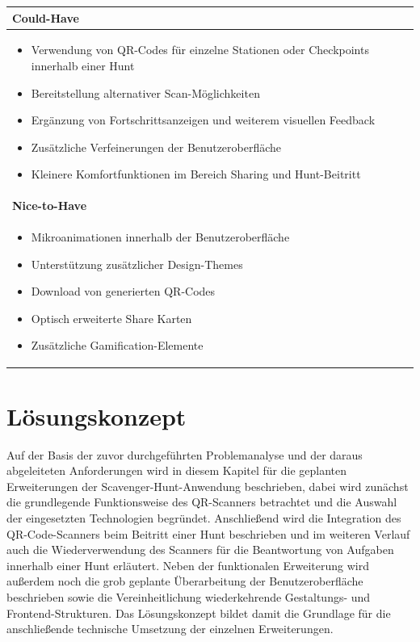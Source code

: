 ﻿\documentclass[oneside]{ausarbeitung}
\begin{document}
\begin{longtable}{|p{\dimexpr\textwidth-2\tabcolsep-2\arrayrulewidth\relax}|}
\textbf{Could-Have} \\ \hline

\begin{itemize}
    \item Verwendung von QR-Codes für einzelne Stationen oder Checkpoints innerhalb einer Hunt
    \item Bereitstellung alternativer Scan-Möglichkeiten
    \item Ergänzung von Fortschrittsanzeigen und weiterem visuellen Feedback
    \item Zusätzliche Verfeinerungen der Benutzeroberfläche
    \item Kleinere Komfortfunktionen im Bereich Sharing und Hunt-Beitritt
\end{itemize}
\\ \hline

\textbf{Nice-to-Have} \\ \hline

\begin{itemize}
    \item Mikroanimationen innerhalb der Benutzeroberfläche
    \item Unterstützung zusätzlicher Design-Themes
    \item Download von generierten QR-Codes
    \item Optisch erweiterte Share Karten
    \item Zusätzliche Gamification-Elemente
\end{itemize}
\\ \hline

\end{longtable}



\chapter{Lösungskonzept}
\label{cha:loesungskonzept}

Auf der Basis der zuvor durchgeführten Problemanalyse und der daraus abgeleiteten Anforderungen wird in diesem Kapitel für die geplanten Erweiterungen der 
Scavenger-Hunt-Anwendung beschrieben, dabei wird zunächst die grundlegende Funktionsweise des QR-Scanners betrachtet und die Auswahl der eingesetzten Technologien 
begründet. Anschließend wird die Integration des QR-Code-Scanners beim Beitritt einer Hunt beschrieben und im weiteren Verlauf auch die Wiederverwendung des Scanners
für die Beantwortung von Aufgaben innerhalb einer Hunt erläutert. Neben der funktionalen Erweiterung wird außerdem noch die grob geplante Überarbeitung der
Benutzeroberfläche beschrieben sowie die Vereinheitlichung wiederkehrende Gestaltungs- und Frontend-Strukturen. Das Lösungskonzept bildet damit die Grundlage für 
die anschließende technische Umsetzung der einzelnen Erweiterungen.
\end{document}
